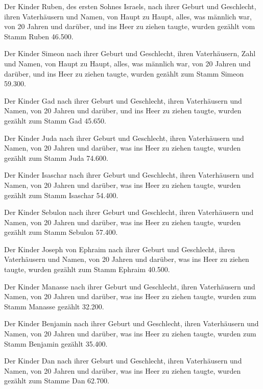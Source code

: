  Der Kinder Ruben, des ersten Sohnes Israels, nach ihrer
Geburt und Geschlecht, ihren Vaterhäusern und Namen, von Haupt zu Haupt,
alles, was männlich war, von 20 Jahren und darüber, und ins Heer zu
ziehen taugte,  wurden gezählt vom Stamm Ruben 46.500.

 Der Kinder Simeon nach ihrer Geburt und Geschlecht, ihren
Vaterhäusern, Zahl und Namen, von Haupt zu Haupt, alles, was männlich
war, von 20 Jahren und darüber, und ins Heer zu ziehen taugte,
 wurden gezählt zum Stamm Simeon 59.300.

 Der Kinder Gad nach ihrer Geburt und Geschlecht, ihren
Vaterhäusern und Namen, von 20 Jahren und darüber, und ins Heer zu
ziehen taugte,  wurden gezählt zum Stamm Gad 45.650.

 Der Kinder Juda nach ihrer Geburt und Geschlecht, ihren
Vaterhäusern und Namen, von 20 Jahren und darüber, was ins Heer zu
ziehen taugte,  wurden gezählt zum Stamm Juda 74.600.

 Der Kinder Isaschar nach ihrer Geburt und Geschlecht,
ihren Vaterhäusern und Namen, von 20 Jahren und darüber, was ins Heer zu
ziehen taugte,  wurden gezählt zum Stamm Isaschar 54.400.

 Der Kinder Sebulon nach ihrer Geburt und Geschlecht, ihren
Vaterhäusern und Namen, von 20 Jahren und darüber, was ins Heer zu
ziehen taugte,  wurden gezählt zum Stamm Sebulon 57.400.

 Der Kinder Joseph von Ephraim nach ihrer Geburt und
Geschlecht, ihren Vaterhäusern und Namen, von 20 Jahren und darüber, was
ins Heer zu ziehen taugte,  wurden gezählt zum Stamm
Ephraim 40.500.

 Der Kinder Manasse nach ihrer Geburt und Geschlecht, ihren
Vaterhäusern und Namen, von 20 Jahren und darüber, was ins Heer zu
ziehen taugte,  wurden zum Stamm Manasse gezählt 32.200.

 Der Kinder Benjamin nach ihrer Geburt und Geschlecht,
ihren Vaterhäusern und Namen, von 20 Jahren und darüber, was ins Heer zu
ziehen taugte,  wurden zum Stamm Benjamin gezählt 35.400.

 Der Kinder Dan nach ihrer Geburt und Geschlecht, ihren
Vaterhäusern und Namen, von 20 Jahren und darüber, was ins Heer zu
ziehen taugte,  wurden gezählt zum Stamme Dan 62.700.

